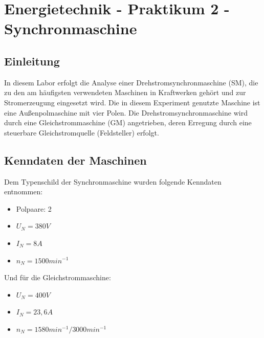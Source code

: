 \documentclass{report}
\begin{document}

\newpage

\tableofcontents

\listoffigures

\newpage
\chapter{Energietechnik - Praktikum 2 - Synchronmaschine}
\section{Einleitung}


In diesem Labor erfolgt die Analyse einer Drehstromsynchronmaschine (SM), die zu den am häufigsten verwendeten Maschinen in Kraftwerken gehört und zur Stromerzeugung eingesetzt wird. Die in diesem Experiment genutzte Maschine ist eine Außenpolmaschine mit vier Polen. Die Drehstromsynchronmaschine wird durch eine Gleichstrommaschine (GM) angetrieben, deren Erregung durch eine steuerbare Gleichstromquelle (Feldsteller) erfolgt.


\section{Kenndaten der Maschinen}

Dem Typenschild der Synchronmaschine wurden folgende Kenndaten entnommen:

\begin{itemize}
	\item Polpaare: 2
	\item $U_{N} = 380V$
	\item $I_{N} = 8A$
	\item $n_{N} = 1500min^{-1}$
\end{itemize}

Und für die Gleichstrommaschine:

\begin{itemize}
	\item $U_{N} = 400V$
	\item $I_{N} = 23,6A$
	\item $n_{N} = 1580min^{-1}/3000min^{-1}$
\end{itemize}
\end{document}
